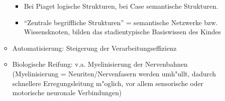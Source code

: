\begin{itemize}
\begin{itemize}
				\begin{itemize}
					\item
						Bei Piaget logische Strukturen, bei Case semantische Strukturen.
					\item
						\enquote{Zentrale begriffliche Strukturen} = semantische Netzwerke bzw. Wissensknoten, bilden das stadientypische Basiswissen des Kindes
				\end{itemize}
			\item
				Automatisierung: Steigerung der Verarbeitungseffizienz
			\item
				Biologische Reifung: v.a. Myelinisierung der Nervenbahnen (Myelinisierung = Neuriten/Nervenfasern werden umh"ullt, dadurch schnellere Erregungsleitung m"oglich, vor allem sensorische oder motorische neuronale Verbindungen)
		\end{itemize}
\end{itemize}
